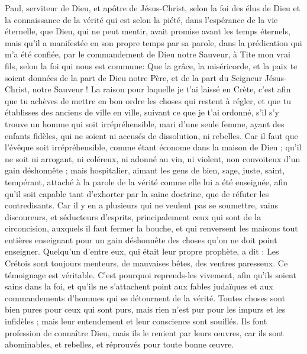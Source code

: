 \begin{multicols}{2}
\VerseOne{}Paul, serviteur de Dieu, et apôtre de Jésus-Christ, selon la foi des élus de Dieu et la connaissance de la vérité qui est selon la piété,
dans l'espérance de la vie éternelle, que Dieu, qui ne peut mentir, avait promise avant les temps éternels,
mais qu'il a manifestée en son propre temps par sa parole, dans la prédication qui m'a été confiée, par le commandement de Dieu notre Sauveur,
à Tite mon vrai fils, selon la foi qui nous est commune: Que la grâce, la miséricorde, et la paix te soient données de la part de Dieu notre Père, et de la part du Seigneur Jésus-Christ, notre Sauveur !
La raison pour laquelle je t'ai laissé en Crète, c'est afin que tu achèves de mettre en bon ordre les choses qui restent à régler, et que tu établisses des anciens de ville en ville, suivant ce que je t'ai ordonné,
s'il s'y trouve un homme qui soit irrépréhensible, mari d'une seule femme, ayant des enfants fidèles, qui ne soient ni accusés de dissolution, ni rebelles.
Car il faut que l'évêque soit irrépréhensible, comme étant économe dans la maison de Dieu ; qu'il ne soit ni arrogant, ni coléreux, ni adonné au vin, ni violent, non convoiteux d'un gain déshonnête ;
mais hospitalier, aimant les gens de bien, sage, juste, saint, tempérant,
attaché à la parole de la vérité comme elle lui a été enseignée, afin qu'il soit capable tant d'exhorter par la saine doctrine, que de réfuter les contredisants.
Car il y en a plusieurs qui ne veulent pas se soumettre, vains discoureurs, et séducteurs d'esprits, principalement ceux qui sont de la circoncision,
auxquels il faut fermer la bouche, et qui renversent les maisons tout entières enseignant pour un gain déshonnête des choses qu'on ne doit point enseigner.
Quelqu'un d'entre eux, qui était leur propre prophète, a dit : Les Crétois sont toujours menteurs, de mauvaises bêtes, des ventres paresseux.
Ce témoignage est véritable. C'est pourquoi reprends-les vivement, afin qu'ils soient sains dans la foi,
et qu'ils ne s'attachent point aux fables judaïques et aux commandements d'hommes qui se détournent de la vérité.
Toutes choses sont bien pures pour ceux qui sont purs, mais rien n'est pur pour les impurs et les infidèles ; mais leur entendement et leur conscience sont souillés.
Ils font profession de connaître Dieu, mais ils le renient par leurs œuvres, car ils sont abominables, et rebelles, et réprouvés pour toute bonne œuvre.

\end{multicols}
